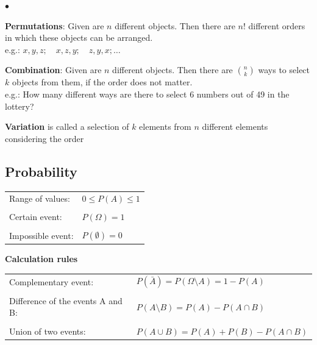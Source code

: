         \begin{list}{$\bullet$}{\setlength{\itemsep}{0cm} \setlength{\parsep}{0cm} \setlength{\topsep}{0.1cm}} 
            \item \textbf{Permutations}: Given are $n$ different objects. Then there are $n!$
            different orders in which these objects can be arranged. \\
            e.g.: $x,y,z;\quad x,z,y;\quad z,y,x;\ldots$
            \item \textbf{Combination}: Given are $n$ different objects. Then there are $\binom n k$
            ways to select $k$ objects from them, if the order does not matter. \\
            e.g.: How many different ways are there to select 6 numbers out of 49
            in the lottery?
            \item \textbf{Variation} is called a selection of $k$ elements from $n$
                different elements considering the order
        \end{list}


\vspace{5mm}
    \begin{minipage}{6.8cm}
    \subsection{Probability}
        \begin{tabular}{ll}
            Range of values:
            & ${0}\le{P(A)}\le{1}$\\ \\
            Certain event:
            & $P(\Omega)=1$\\ \\
            Impossible event:
            & $P(\emptyset)=0$
        \end{tabular}
    \end{minipage}
        \begin{minipage}{11.2cm}
        \textbf{Calculation rules}\\
            \begin{tabular}{ll}
                Complementary event:
                &$P(\bar{A})=P({\Omega}\setminus{A})=1-P(A)$\\ \\
                Difference of the events A and B:
                &$P({A}\setminus{B})=P(A)-P({A}\cap{B})$\\ \\
                Union of two events:
                &$P({A}\cup{B})=P(A)+P(B)-P({A}\cap{B})$
            \end{tabular}
        \end{minipage}
\vspace{1mm}


